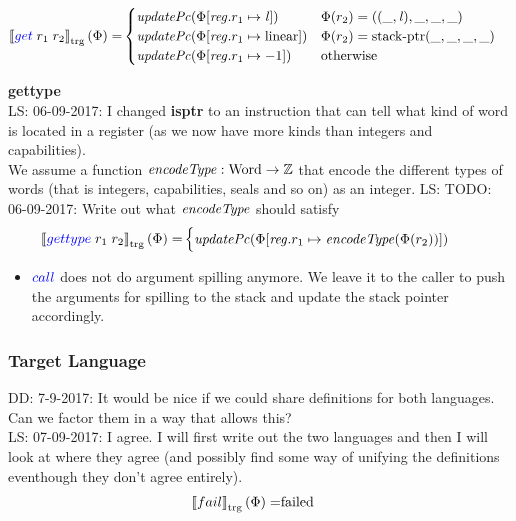 \documentclass[a4paper]{article}
\newcommand\lau[1]{{\color{purple} \sf \footnotesize {LS: #1}}\\}
\newcommand\dominique[1]{{\color{purple} \sf \footnotesize {DD: #1}}\\}
\newcommand{\sem}[1]{\left\llbracket #1 \right\rrbracket}
\newcommand{\tsem}[2][\Phi]{\sem{#2}_{\mathrm{trg}}(#1)}
\newcommand{\totherwise}{\text{otherwise }}
\newcommand{\sourcecolor}[1]{\color{blue}}
\newcommand{\src}[1]{{\sourcecolor{} #1}}
\newcommand{\targetcolor}[1]{\color{black}}
\newcommand{\trg}[1]{{\targetcolor{} #1}}
\newcommand{\zinstr}[1]{#1}
\newcommand{\twoinstr}[3]{
  \ifthenelse{\equal{#2#3}{}}
  {\zinstr{#1}}
  {\zinstr{#1} \; #2 \; #3}
}
\newcommand{\sisptr}[2]{\twoinstr{\src{gettype}}{#1}{#2}}
\newcommand{\sgetlin}[2]{\twoinstr{\src{get}}{#1}{#2}}
\newcommand{\scall}[2]{\twoinstr{\src{call}}{#1}{#2}}
\newcommand{\tfail}{\zinstr{\trg{fail}}}
\newcommand{\ints}{\mathbb{Z}}
\newcommand{\update}[2]{[#1 \mapsto #2]}
\newcommand{\updReg}[2]{\update{\reg.#1}{#2}}
\newcommand{\shareddom}[1]{\mathrm{#1}}
\newcommand{\Word}{\shareddom{Word}}
\newcommand{\lin}{\var{l}}
\newcommand{\stkptr}[1]{\mathrm{stack\text{-}ptr}(#1)}
\newcommand{\failed}{\mathrm{failed}}
\newcommand{\var}[1]{\mathit{#1}}
\newcommand{\reg}{\var{reg}}
\newcommand{\plainlinearity}[1]{\mathrm{#1}}
\newcommand{\linear}{\plainlinearity{linear}}
\newcommand{\plainfun}[2]{
  \ifthenelse{\equal{#2}{}}
  {\mathit{#1}}
  {\mathit{#1}(#2)}
}
\newcommand{\encType}[1]{\plainfun{encodeType}{#1}}
\newcommand{\updPcAddr}[1]{\plainfun{updatePc}{#1}}
\begin{document}
\begin{align*}
  \tsem{\sgetlin{r_1}{r_2}} = &                              
                              \begin{cases}
                                \updPcAddr{}(\Phi\update{\reg.r_1}{\lin}) & \Phi(r_2) = ((\_,\lin),\_,\_,\_) \\
                                \updPcAddr{\Phi\updReg{r_1}{\linear}} & \Phi(r_2) = \stkptr{\_,\_,\_,\_}\\
                                \updPcAddr{\Phi\updReg{r_1}{-1}} & \totherwise
                              \end{cases}
\end{align*}

\textbf{gettype}\\
\lau{06-09-2017: I changed \textbf{isptr} to an instruction that can tell what kind of word is located in a register (as we now have more kinds than integers and capabilities).}
We assume a function $\encType{} : \Word \rightarrow \ints$ that encode the different types of words (that is integers, capabilities, seals and so on) as an integer.
\lau{TODO: 06-09-2017: Write out what $\encType{}$ should satisfy}
\begin{align*}
  \tsem{\sisptr{r_1}{r_2}} = & 
                               \begin{cases}
                                 \updPcAddr{}(\Phi\updReg{r_1}{\encType{\Phi(r_2)}})
                               \end{cases}
\end{align*}


\begin{itemize}
\item $\scall{}{}$ does not do argument spilling anymore. We leave it to the caller to push the arguments for spilling to the stack and update the stack pointer accordingly.
\end{itemize}

\subsubsection{Target Language}
\dominique{7-9-2017: It would be nice if we could share definitions for both languages.  Can we factor them in a way that allows this?}
\lau{07-09-2017: I agree. I will first write out the two languages and then I will look at where they agree (and possibly find some way of unifying the definitions eventhough they don't agree entirely).}

\begin{align*}
  \tsem{\tfail} = & \failed
\end{align*}
\end{document}
